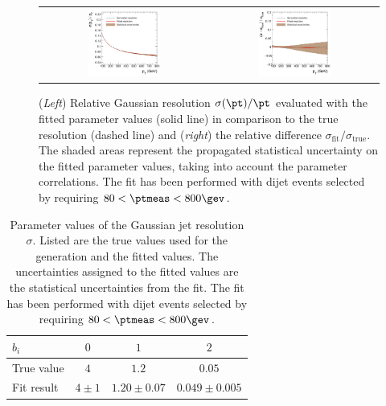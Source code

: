 \begin{figure}[ht]
  \centering
  \begin{tabular}{cc}
    \includegraphics[width=0.45\textwidth]{figures/resFit_ToyMC_PtCuts_Sigma} &
    \includegraphics[width=0.45\textwidth]{figures/resFit_ToyMC_PtCuts_SigmaRelDifference} \\
  \end{tabular}
  \caption{(\textit{Left}) Relative Gaussian resolution $\sigma(\pt)/\pt$ evaluated with the fitted
    parameter values (solid line) in comparison to the true resolution
    (dashed line) and (\textit{right}) the relative difference
    $\sigma_{\text{fit}} / \sigma_{\text{true}}$.
    The shaded areas represent the propagated statistical
    uncertainty on the fitted parameter values, taking into account the
    parameter correlations.
    The fit has been performed with dijet events selected by requiring \mbox{$80 < \ptmeas < 800\gev$}.}
  \label{fig:ResFit:ToyMC:PtCuts:FittedSigma}
\end{figure}


\begin{table}[ht]
  \caption{Parameter values of the Gaussian jet \pt resolution
    $\sigma$.
    Listed are the true values used for the generation and
    the fitted values.
    The uncertainties assigned to the fitted values
    are the statistical uncertainties from the fit.
    The fit has been performed with dijet events selected by requiring \mbox{$80 < \ptmeas < 800\gev$}.}
  \centering
  \begin{tabular}[ht]{lccc}
    \toprule
    $b_{i}$ & $0$ & $1$ & $2$ \\
    \midrule
    True value & $4$           & $1.2$                   & $0.05$ \\
    Fit result   & $4 \pm 1$ & $1.20 \pm 0.07$ & $0.049 \pm 0.005$ \\
    \bottomrule
   \end{tabular}
 \label{tab:ResFit:ToyMC:PtCuts:FitResult}
\end{table}


